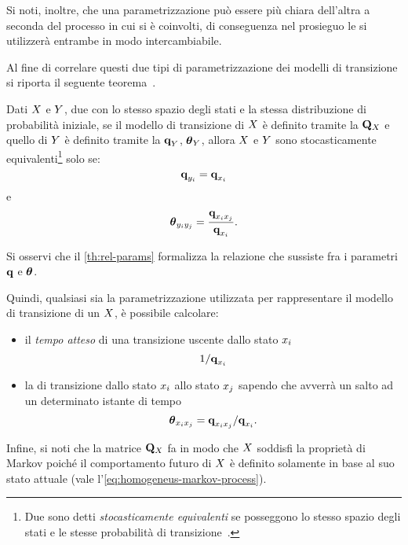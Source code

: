 \begin{osservazione}
Si noti, inoltre, che una parametrizzazione può essere più chiara dell'altra a seconda del processo in cui si è coinvolti, di conseguenza nel prosieguo le si utilizzerà entrambe in modo intercambiabile.
\end{osservazione}
Al fine di correlare questi due tipi di parametrizzazione dei modelli di transizione si riporta il seguente teorema~\citep{Nodelman2007}.
\begin{teorema}\label{th:rel-params}
Dati $\mathnormal{X}$ e $\mathnormal{Y}$, due \mprocess{} \omog{} con lo stesso spazio degli stati e la stessa distribuzione di probabilità iniziale, se il modello di transizione di $\mathnormal{X}$ è definito tramite la \im*{} $\mathbf{Q}_{\mathnormal{X}}$ e quello di $\mathnormal{Y}$ è definito tramite la  $\boldsymbol{\textbf{\text{q}}}_{\mathnormal{Y}}$, $\boldsymbol{\textbf{\text{$\theta$}}}_{\mathnormal{Y}}$, allora $\mathnormal{X}$ e $\mathnormal{Y}$ sono stocasticamente equivalenti\footnote{Due \mprocess{} sono detti \emph{stocasticamente equivalenti} se posseggono lo stesso spazio degli stati e le stesse probabilità di transizione~\citep{Gihman1973}.} solo se:
\[
\boldsymbol{\textbf{\text{q}}}_{\mathnormal{y}_i} = \boldsymbol{\textbf{\text{q}}}_{\mathnormal{x}_i}
\]
e
\[
\boldsymbol{\textbf{\text{$\theta$}}}_{\mathnormal{y}_i\mathnormal{y}_j} = \frac{\boldsymbol{\textbf{\text{q}}}_{\mathnormal{x}_i\mathnormal{x}_j}}{\boldsymbol{\textbf{\text{q}}}_{\mathnormal{x}_i}}\text{.}
\]
\end{teorema}
\begin{osservazione}
Si osservi che il \autoref{th:rel-params} formalizza la relazione che sussiste fra i parametri $\boldsymbol{\textbf{\text{q}}}$ e $\boldsymbol{\textbf{\text{$\theta$}}}$.
\end{osservazione}
Quindi, qualsiasi sia la parametrizzazione utilizzata per rappresentare il modello di transizione di un \mprocess*{} \omog*{} $\mathnormal{X}$, è possibile calcolare:
\begin{itemize}
    \item il \emph{tempo atteso} di una transizione uscente dallo stato $\mathnormal{x}_i$ \[1/\boldsymbol{\textbf{\text{q}}}_{\mathnormal{x}_i}\]
    \item la \emph{} di transizione dallo stato $\mathnormal{x}_i$ allo stato $\mathnormal{x}_j$ sapendo che avverrà un salto ad un determinato istante di tempo \[\boldsymbol{\textbf{\text{$\theta$}}}_{\mathnormal{x}_i\mathnormal{x}_j}=\boldsymbol{\textbf{\text{q}}}_{\mathnormal{x}_i\mathnormal{x}_j}/\boldsymbol{\textbf{\text{q}}}_{\mathnormal{x}_i}\text{.}\]
\end{itemize}
Infine, si noti che la matrice $\mathbf{Q}_{\mathnormal{X}}$ fa in modo che $\mathnormal{X}$ soddisfi la proprietà di Markov poiché il comportamento futuro di $\mathnormal{X}$ è definito solamente in base al suo stato attuale (vale l'\autoref{eq:homogeneus-markov-process}).

